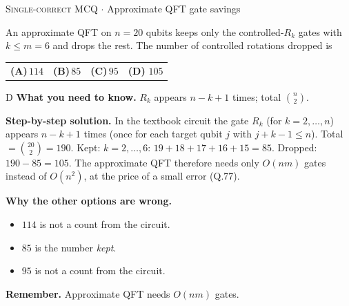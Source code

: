 \documentclass[11pt,a4paper]{article}
\newcommand{\optlabel}[1]{\textbf{(#1)}}
\newcommand{\correctlabel}[1]{\textcolor{okgreen}{\textbf{(#1)}\,\ding{51}}}
\newenvironment{qitem}[1]{\begin{list}{}{\setlength{\leftmargin}{3.3em}\setlength{\labelwidth}{3.1em}%
  \setlength{\labelsep}{0.2em}\setlength{\topsep}{3pt}\setlength{\parsep}{3pt}}\item[\textbf{Q.#1}\hfill]}{\end{list}}
\newcommand{\qsep}{\par\vspace{2pt}{\color{black!15}\hrule}\vspace{4pt}}
\newcommand{\qmeta}[2]{{\footnotesize\color{black!60}\textsc{#1} \;$\cdot$\; #2}\par}
\begin{document}
\begin{qitem}{71}
\qmeta{Single-correct MCQ}{Approximate QFT gate savings}
An approximate QFT on $n = 20$ qubits keeps only the controlled-$R_k$ gates with $k \le m = 6$ and drops the rest.
The number of controlled rotations dropped is
\par\smallskip\noindent\begin{tabularx}{\linewidth}{@{}*{4}{L}@{}}
\optlabel{A}\,$114$ & \optlabel{B}\,$85$ & \optlabel{C}\,$95$ & \correctlabel{D}\,$105$
\end{tabularx}
\end{qitem}
\begin{solbox}{D}
\textbf{\color{brand}What you need to know.} $R_k$ appears $n - k + 1$ times; total $\binom n2$.

\textbf{\color{brand}Step-by-step solution.} In the textbook circuit the gate $R_k$ (for $k = 2, \dots, n$) appears $n - k + 1$ times (once for each target qubit $j$
with $j + k - 1 \le n$). Total $= \binom{20}{2} = 190$. Kept: $k = 2, \dots, 6$: $19 + 18 + 17 + 16 + 15 = 85$. Dropped:
$190 - 85 = 105$. The approximate QFT therefore needs only $O(nm)$ gates instead of $O(n^2)$, at the price of a small error
(Q.77).

\textbf{\color{brand}Why the other options are wrong.}
\begin{itemize}[leftmargin=2.4em, itemsep=1pt, topsep=2pt]
\item[\textbf{(A)}] $114$ is not a count from the circuit.
\item[\textbf{(B)}] $85$ is the number \emph{kept}.
\item[\textbf{(C)}] $95$ is not a count from the circuit.
\end{itemize}
\textbf{\color{brand}Remember.} Approximate QFT needs $O(nm)$ gates.
\end{solbox}
\qsep
\end{document}
